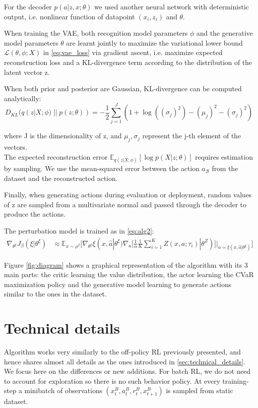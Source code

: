 For the decoder $p(a|z,x; \theta)$ we used another neural network with deterministic output, i.e. nonlinear function of 
datapoint $(x_i,z_i)$ and $\theta$.

When training the VAE, both recognition model parameters $\phi$ and the generative model parameters $\theta$ are
learnt jointly to maximize the variational lower bound $\mathcal{L}(\theta, \phi; X)$ in \ref{eq:vae_loss} 
via gradient ascent, i.e. maximize expected reconstruction loss and a KL-divergence term
according to the distribution of the latent vector z.

When both prior and posterior are Gaussian, KL-divergence can be computed analytically:
\begin{equation}
    D_{KL}(q(z|X;\phi)\; ||\;p(z; \theta)) = -\frac{1}{2}\sum_{j=1}^J (1+\log((\sigma_j)^2)-(\mu_j)^2-(\sigma_j)^2) \label{eq:kl_div}
\end{equation}

where J is the dimensionality of z, and $\mu_j,\sigma_j$ represent the j-th element of the vectors.\\
The expected reconstruction error 
$\mathbb E_{q(z|X;\phi)} [\log p(X|z; \theta)]$
requires estimation by sampling. We use the mean-squared error between the action $a_\mathcal{B}$
from the dataset and the reconstructed action.

Finally, when generating actions during evaluation or deployment, random values of z are sampled from a
multivariate normal and passed through the decoder to produce the actions.



The perturbation model is trained as in \ref{eq:alg2}:
\begin{align}
    \nabla_{\theta^\xi} J_\beta(\xi | \theta^\xi) &\approx \mathbb E_{x \sim \rho^\beta} 
\big [\nabla_{\theta^\xi} \xi(x,\hat{a}| \theta^\xi) \nabla_a  [\frac{1}{\alpha} \frac{1}{K}
\sum_{i=1}^K Z(x,a; \tau_i) | \theta^Z)]|_{a=\xi(x,\hat{a}| \theta^\xi)}  \big] \label{eq:algbatchrl_2}
\end{align}

Figure \ref{fig:diagram} shows a graphical representation of the algorithm with its 3 main parts:
the critic learning the value distribution, the actor learning the CVaR maximization policy and
the generative model learning to generate actions similar to the ones in the dataset.

\section{Technical details}
Algorithm works very similarly to the off-policy RL previously presented, and hence shares almost all details
as the ones introduced in \ref{sec:technical_details}.
We focus here on the differences or new additions.
For batch RL, we do not need to account for exploration so there is no such behavior policy.
At every training-step a minibatch of observations  $(x_t^B,a_t^B,r_t^B,x_{t+1}^B)$ is sampled from
static dataset.


